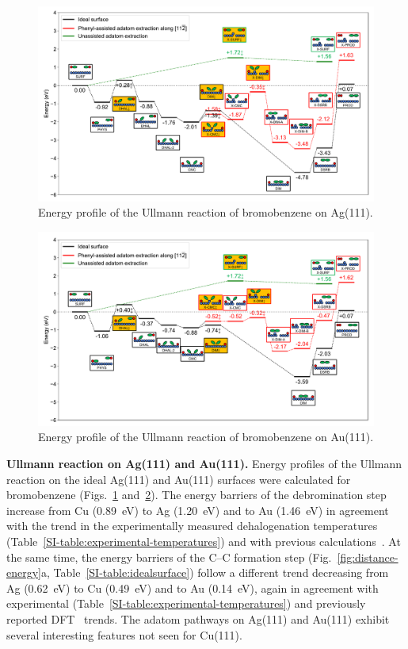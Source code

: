 \documentclass[aps,prb,amsmath,amssymb,11pt]{revtex4-1}
\begin{document}
\begin{figure}[bt]
\centering
\includegraphics[width=1.\textwidth]{Fig/Ag_mainfile.pdf}
\caption{Energy profile of the Ullmann reaction of bromobenzene on Ag(111).}
\label{fig:Ag_all}
\end{figure}

\begin{figure}[bt]
\centering
\includegraphics[width=1.\textwidth]{Fig/Au_mainfile.pdf}
\caption{Energy profile of the Ullmann reaction of bromobenzene on Au(111).}
\label{fig:Au_all}
\end{figure}


\textbf{Ullmann reaction on Ag(111) and Au(111).}
%
Energy profiles of the Ullmann reaction on the ideal Ag(111) and Au(111) surfaces were calculated for bromobenzene (Figs.~\ref{fig:Ag_all} and~\ref{fig:Au_all}). 
The energy barriers of the debromination step increase from Cu (\SI{0.89}{\electronvolt}) to Ag (\SI{1.20}{\electronvolt}) and to Au (\SI{1.46}{\electronvolt}) in agreement with the trend in the experimentally measured dehalogenation temperatures~\cite{ullmann_52,ullmann_87,ullmann_67} (Table~\ref{SI-table:experimental-temperatures}) and with previous calculations~\cite{jacs2013}.
At the same time, the energy barriers of the C--C formation step (Fig.~\ref{fig:distance-energy}a, Table~\ref{SI-table:idealsurface}) follow a different trend decreasing from Ag (\SI{0.62}{\electronvolt}) to Cu (\SI{0.49}{\electronvolt}) and to Au (\SI{0.14}{\electronvolt}), again in agreement with experimental (Table~\ref{SI-table:experimental-temperatures}) and previously reported DFT~\cite{jacs2013} trends. The adatom pathways on Ag(111) and Au(111) exhibit several interesting features not seen for Cu(111).
\end{document}
